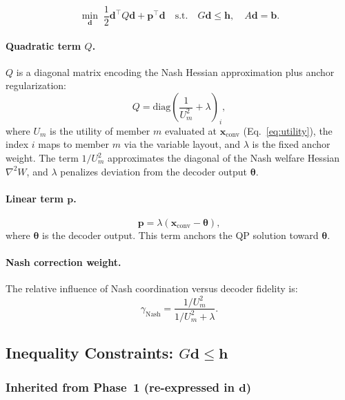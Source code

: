 \documentclass[11pt,a4paper]{article}
\newcommand{\xconv}{\mathbf{x}_{\mathrm{conv}}}
\newcommand{\thetapacked}{\boldsymbol{\theta}}
\begin{document}
\begin{equation}
    \min_{\mathbf{d}} \; \frac{1}{2} \mathbf{d}^\top Q \mathbf{d} + \mathbf{p}^\top \mathbf{d}
    \quad \text{s.t.} \quad
    G\mathbf{d} \leq \mathbf{h}, \quad
    A\mathbf{d} = \mathbf{b}.
    \label{eq:qp}
\end{equation}

\paragraph{Quadratic term $Q$.}
$Q$ is a diagonal matrix encoding the Nash Hessian approximation plus anchor regularization:
\begin{equation}
    Q = \mathrm{diag}\!\left(\frac{1}{U_m^2} + \lambda\right)_{i},
    \label{eq:Q}
\end{equation}
where $U_m$ is the utility of member $m$ evaluated at $\xconv$ (Eq.~\ref{eq:utility}), the index $i$ maps to member $m$ via the variable layout, and $\lambda$ is the fixed anchor weight.
The term $1/U_m^2$ approximates the diagonal of the Nash welfare Hessian $\nabla^2 W$, and $\lambda$ penalizes deviation from the decoder output $\thetapacked$.

\paragraph{Linear term $\mathbf{p}$.}
\begin{equation}
    \mathbf{p} = \lambda \left(\xconv - \thetapacked\right),
    \label{eq:p}
\end{equation}
where $\thetapacked$ is the decoder output. This term anchors the QP solution toward $\thetapacked$.

\paragraph{Nash correction weight.}
The relative influence of Nash coordination versus decoder fidelity is:
\begin{equation}
    \gamma_{\mathrm{Nash}} = \frac{1/U_m^2}{1/U_m^2 + \lambda}.
    \label{eq:correction_weight}
\end{equation}

\subsection{Inequality Constraints: $G\mathbf{d} \leq \mathbf{h}$}

\subsubsection*{Inherited from Phase~1 (re-expressed in $\mathbf{d}$)}
\end{document}
